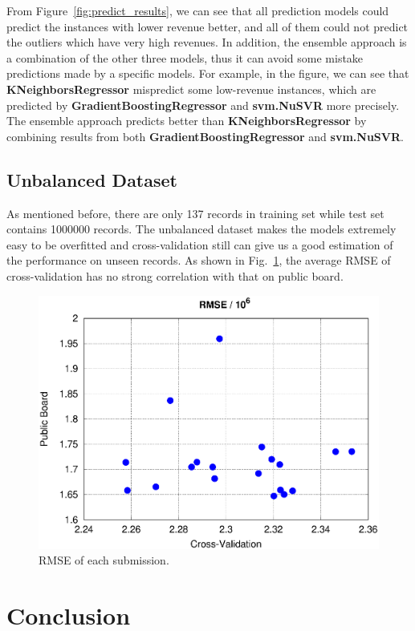 \documentclass[10pt, oneside]{article}   	%
\newcommand\figref{Fig.~\ref}
\begin{document}
From Figure~\ref{fig:predict_results}, we can see that all prediction models could predict the instances with lower revenue better, and all of them could not predict the outliers which have very high revenues. In addition, the ensemble approach is a combination of the other three models, thus it can avoid some mistake predictions made by a specific models. For example, in the figure, we can see that \textbf{KNeighborsRegressor} mispredict some low-revenue instances, which are predicted by \textbf{GradientBoostingRegressor} and \textbf{svm.NuSVR} more precisely. The ensemble approach predicts better than  \textbf{KNeighborsRegressor} by combining results from both \textbf{GradientBoostingRegressor} and \textbf{svm.NuSVR}.

 
\subsection{Unbalanced Dataset}
As mentioned before, there are only 137 records in training set while test set contains 1000000 records.
The unbalanced dataset makes the models extremely easy to be overfitted and cross-validation still can give us a good estimation of the performance on unseen records.
As shown in \figref{fig:cv_lb_error}, the average RMSE of cross-validation has no strong correlation with that on public board.

\begin{figure}[htbp] %
   \centering
   \includegraphics[width=5in]{figs/scores.eps} 
   \caption{RMSE of each submission.}
   \label{fig:cv_lb_error}
\end{figure}


\section{Conclusion}
\end{document}
